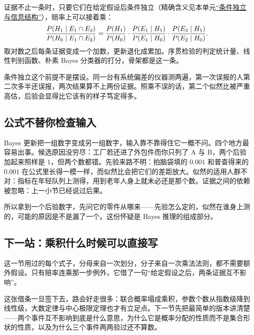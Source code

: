 证据不止一条时，只要它们在给定假设后条件独立（精确含义见本单元\hyperref[sec:05-Probability/02-Conditional-Probability/04]{``条件独立与信息结构''}），赔率上可以接着乘：
\[
\frac{P(H_1\mid E_1\cap E_2)}{P(H_0\mid E_1\cap E_2)}
=\frac{P(H_1)}{P(H_0)}\cdot\frac{P(E_1\mid H_1)}{P(E_1\mid H_0)}\cdot\frac{P(E_2\mid H_1)}{P(E_2\mid H_0)}.
\]
取对数之后每条证据变成一个加数，更新退化成累加。序贯检验的判定统计量、线性判别函数、朴素 Bayes 分类器的打分，骨架都是这一条。

条件独立这个前提不是摆设。同一台有系统偏差的仪器测两遍，第一次误报的人第二次多半还误报，两次结果算不上两份证据。照乘不误的话，第二个似然比被严重高估，后验会显得比它该有的样子笃定得多。

\subsection{公式不替你检查输入}

Bayes 更新把一组数字变成另一组数字，输入靠不靠得住它一概不问。四个地方最容易出事。候选原因没穷尽：工厂若还进了外包件而你只列了 A 与 B，两个后验加起来照样是 \(1\)，但两个数都错。先验来路不明：拍脑袋填的 \(0.001\) 和普查得来的 \(0.001\) 在公式里长得一模一样，而似然比会把它们的差距放大。似然的适用人群不对：指标在年轻队列上测得，用到老年人身上就未必还是那个数。证据之间的依赖被忽略：上一小节已经说过后果。

所以拿到一个后验数字，先问它的零件从哪来——先验怎么定的，似然在谁身上测的，可能的原因是不是漏了一个。这份怀疑是 Bayes 推理的组成部分。

\subsection{下一站：乘积什么时候可以直接写}

这一节用过的每个式子，分母来自一次划分，分子来自一次乘法法则，都不需要额外假设。只有赔率连乘那一步例外，它借了一句``给定假设之后，两条证据互不影响''。

这张借条一旦签下去，路会好走很多：联合概率塌成乘积，参数个数从指数级降到线性级，大数定律与中心极限定理也才有立足点。下一节先把最简单的版本讲清楚——两个事件互不影响到底是什么意思，为什么它是概率分配的性质而不是集合形状的性质，以及为什么三个事件两两验过还不算数。
